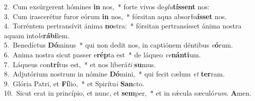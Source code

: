 {2.~}Cum exsúrgerent hómines \textbf{in} nos,~* forte vivos de\textit{glu}\textbf{tís}\textbf{sent} nos:\\
{3.~}Cum irascerétur furor eórum \textbf{in} nos,~* fórsitan aqua absor\textit{bu}\textbf{ís}\textbf{set} nos.\\
{4.~}Torréntem pertransívit ánima \textbf{no}stra:~* fórsitan pertransísset ánima nostra aquam into\textit{le}\textbf{rá}\textbf{bi}lem.\\
{5.~}Benedíctus \textbf{Dó}minus~* qui non dedit nos, in captiónem déntibus \textit{e}\textbf{ó}rum.\\
{6.~}Anima nostra sicut passer e\textbf{rép}ta est~* de láqueo \textit{ve}\textbf{nán}\textbf{ti}um.\\
{7.~}Láqueus con\textbf{trí}tus est,~* et nos liberá\textit{ti} \textbf{su}mus.\\
{8.~}Adjutórium nostrum in nómine \textbf{Dó}mini,~* qui fecit cælum \textit{et} \textbf{ter}ram.\\
{9.~}Glória Patri, et \textbf{Fí}lio,~* et Spirítu\textit{i} \textbf{San}cto.\\
{10.~}Sicut erat in princípio, et nunc, et \textbf{sem}per,~* et in sǽcula sæculó\textit{rum}. \textbf{A}men.\\
